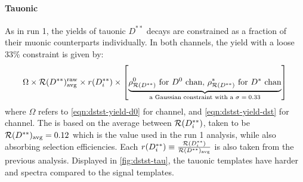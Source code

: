 \paragraph{Tauonic}
As in run 1, the yields of  tauonic $D^{**}$ decays are constrained as a
fraction of their muonic counterparts individually.
In both channels, the yield with a loose 33\% constraint is given by:
\begin{equation}
    \Omega \times \fitRDststRaw \times \fitRDiRatio \times \left[
        \underbrace{\text{\fitRDDstst for \Dz chan, \fitRDstst for \Dstar chan}}_\text{
            a Gaussian constraint with a $\sigma = 0.33$
        }
    \right]
\end{equation}
where $\Omega$ refers to \cref{eqn:dstst-yield-d0} for \Dz channel,
and \cref{eqn:dstst-yield-dst} for \Dstar channel.
The \fitRDststRaw is based on the average between $\mathcal{R}(D^{**}_i)$,
taken to be $\mathcal{R}(D^{**})_\text{avg} = 0.12$ which is the value used in
the run 1 analysis,
while also absorbing selection efficiencies.
Each
$r(D^{**}_i) \equiv \frac{\mathcal{R}(D^{**}_i)}{\mathcal{R}(D^{**})_\text{avg}}$
is also taken from the previous analysis.
Displayed in \ref{fig:dstst-tau},
the tauonic \Dstst templates have harder \mmSq and \qSq spectra compared to the
signal templates.

